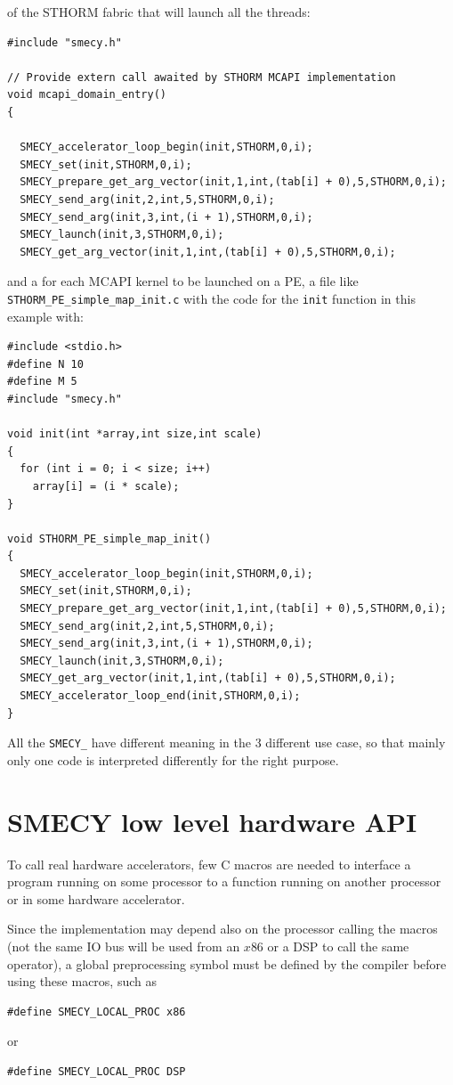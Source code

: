 \documentclass[a4paper]{article}
\begin{document}
of the STHORM fabric that will launch all the threads:
\begin{lstlisting}
#include "smecy.h"

// Provide extern call awaited by STHORM MCAPI implementation
void mcapi_domain_entry()
{

  SMECY_accelerator_loop_begin(init,STHORM,0,i);
  SMECY_set(init,STHORM,0,i);
  SMECY_prepare_get_arg_vector(init,1,int,(tab[i] + 0),5,STHORM,0,i);
  SMECY_send_arg(init,2,int,5,STHORM,0,i);
  SMECY_send_arg(init,3,int,(i + 1),STHORM,0,i);
  SMECY_launch(init,3,STHORM,0,i);
  SMECY_get_arg_vector(init,1,int,(tab[i] + 0),5,STHORM,0,i);
\end{lstlisting}
and a for each MCAPI kernel to be launched on a PE, a file like
\verb|STHORM_PE_simple_map_init.c| with the code for the \verb|init|
function in this example with:
\begin{lstlisting}
#include <stdio.h>
#define N 10
#define M 5
#include "smecy.h"

void init(int *array,int size,int scale)
{
  for (int i = 0; i < size; i++)
    array[i] = (i * scale);
}

void STHORM_PE_simple_map_init()
{
  SMECY_accelerator_loop_begin(init,STHORM,0,i);
  SMECY_set(init,STHORM,0,i);
  SMECY_prepare_get_arg_vector(init,1,int,(tab[i] + 0),5,STHORM,0,i);
  SMECY_send_arg(init,2,int,5,STHORM,0,i);
  SMECY_send_arg(init,3,int,(i + 1),STHORM,0,i);
  SMECY_launch(init,3,STHORM,0,i);
  SMECY_get_arg_vector(init,1,int,(tab[i] + 0),5,STHORM,0,i);
  SMECY_accelerator_loop_end(init,STHORM,0,i);
}
\end{lstlisting}
All the \verb|SMECY_| have different meaning in the 3 different use case,
so that mainly only one code is interpreted differently for the right
purpose.


\section{SMECY low level hardware API}
\label{sec:low-level-hardware}

To call real hardware accelerators, few C macros are needed to interface a
program running on some processor to a function running on another
processor or in some hardware accelerator.

Since the implementation may depend also on the processor calling the
macros (not the same IO bus will be used from an $x$86 or a DSP to call
the same operator), a global preprocessing symbol must be defined by the
compiler before using these macros, such as
\begin{lstlisting}
#define SMECY_LOCAL_PROC x86
\end{lstlisting}
or
\begin{lstlisting}
#define SMECY_LOCAL_PROC DSP
\end{lstlisting}
\end{document}
